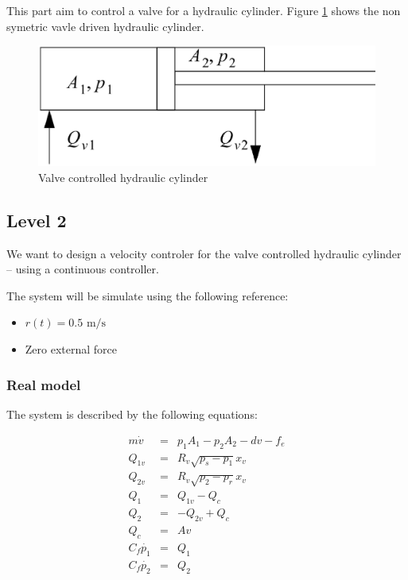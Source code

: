 This part aim to control a valve for a hydraulic cylinder. Figure \ref{valve} shows the non symetric vavle driven hydraulic cylinder. 

\begin{figure}
 \includegraphics[width=\linewidth]{fig/valve.ps}
 \caption{Valve controlled hydraulic cylinder}
 \label{valve}
\end{figure}

\subsection*{Level 2}

We want to design a velocity controler for the valve controlled hydraulic cylinder -- using a continuous controller. 

The system will be simulate using the following reference:
\begin{itemize}
 \item $r(t) = 0.5 \text{ m/s}$
 \item Zero external force
\end{itemize}

\subsubsection*{Real model}
The system is described by the following equations:

$$
\begin{array}{rcl}
    m \dot{v} & = & p_1 A_1 - p_2 A_2 - d v - f_e \\
    Q_{1v} & = & R_v \sqrt{p_s - p_1} x_v \\
    Q_{2v} & = & R_v \sqrt{p_2 - p_r} x_v \\
    Q_1 & = & Q_{1v} - Q_c \\
    Q_2 & = & - Q_{2v} + Q_c \\
    Q_c & = & A v \\
    C_f \dot{p_1} & = & Q_1 \\
    C_f \dot{p_2} & = & Q_2 \\
\end{array}
$$

